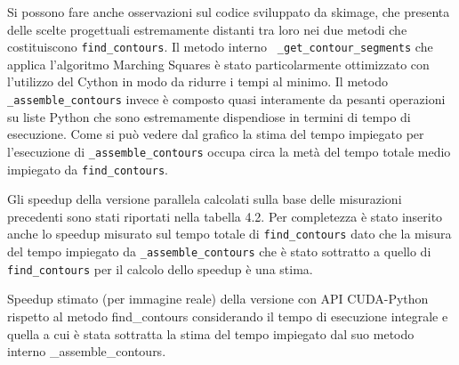 \documentclass[12pt,a4paper]{report}
\begin{document}
{%
\begin{figure}[H]
\centering
\begin{floatrow}[1]
\end{floatrow}
\end{figure} 

Si possono fare anche osservazioni sul codice sviluppato da skimage, che presenta delle scelte progettuali estremamente distanti tra loro nei due metodi che costituiscono \verb|find_contours|. Il metodo interno \verb| _get_contour_segments| che applica l'algoritmo Marching Squares è stato particolarmente ottimizzato con l'utilizzo del Cython in modo da ridurre i tempi al minimo. Il metodo \verb|_assemble_contours| invece è composto quasi interamente da pesanti operazioni su liste Python che sono estremamente dispendiose in termini di tempo di esecuzione. Come si può vedere dal grafico la stima del tempo impiegato per l'esecuzione di \verb|_assemble_contours| occupa circa la metà del tempo totale medio impiegato da \verb|find_contours|.
\newpage

Gli speedup della versione parallela calcolati sulla base delle misurazioni precedenti sono stati riportati nella tabella 4.2. Per completezza è stato inserito anche lo speedup misurato sul tempo totale di \verb|find_contours| dato che la misura del tempo impiegato da \verb|_assemble_contours| che è stato sottratto a quello di \verb|find_contours| per il calcolo dello speedup è una stima.

\begin{table}[h]
\centering
\setlength\tabcolsep{0pt} %
\caption{Speedup stimato (per immagine reale) della versione con API CUDA-Python rispetto al metodo find\_contours considerando il tempo di esecuzione integrale e quella a cui è stata sottratta la stima del tempo impiegato dal suo metodo interno \_assemble\_contours.}
\label{t3}


\end{table}}
\end{document}
